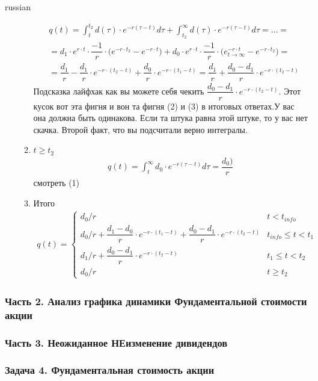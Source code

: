 \documentclass{article}
\begin{document}
\begin{otherlanguage*}{russian}
\begin{itemize}
\begin{enumerate}
\begin{align*}
&q(t) = \int_{t}^{t_2} d(\tau) \cdot e^{-r(\tau - t)} d \tau + \int_{t_2}^{\infty} d(\tau) \cdot e^{-r(\tau - t)} d \tau = \ldots = \\
&= d_1 \cdot e^{r \cdot t} \cdot \dfrac{-1}{r} \cdot  \Big( e^{-r \cdot t_2} - e^{-r \cdot t} \Big) + d_0 \cdot e ^{r \cdot t } \cdot \dfrac{-1}{r} \cdot \Big( e^{-r \cdot t}_{t \rightarrow \infty} - e^{-r \cdot t_2} \Big) = \\
&= \dfrac{d_1}{r} - \dfrac{d_1}{r} \cdot e ^{-r \cdot (t_2 -t)} + \dfrac{d_0}{r} \cdot e ^{-r \cdot (t_1 - t)} = \dfrac{d_1}{r} + \dfrac{d_0 - d_1}{r} \cdot e ^ {-r \cdot (t_2 - t)} 
\end{align*}
Подсказка лайфхак как вы можете себя чекить $ \dfrac{d_0 - d_1}{r} \cdot e^{-r \cdot (t_2 - t)} $. Этот кусок вот эта фигня и вон та фигня (2) и (3) в итоговых ответах.У вас она должна быть одинакова. Если та штука равна этой штуке, то у вас нет скачка. Второй факт, что вы подсчитали верно интегралы.
\item $ t \ge t_2 $ 
\begin{align*}
q(t) = \int_{t}^{\infty} d_0 \cdot e^{-r(\tau - t)} d \tau = \dfrac{d_0)}{r}
\end{align*} смотреть (1) 
\item Итого
\begin{align*}
q(t) = \begin{cases} 
d_0 / r  & t < t_{info}  \\
d_0 / r + \dfrac{d_1 - d_0}{r} \cdot e^{-r \cdot (t_1 - t) } + \dfrac{d_0 - d_1}{r} \cdot e ^{-r \cdot (t_2 - t) } & t_{info} \le t < t_1\\
d_1 / r + \dfrac{d_0 - d_1}{r} \cdot e ^ {-r \cdot (t_2 - t)} & t_1 \le t < t_2 \\
d_0 / r  & t \ge t_2
\end{cases}
\end{align*}
\end{enumerate}
\end{itemize}
\subsubsection*{Часть 2. Анализ графика динамики Фундаментальной стоимости акции}
\subsubsection*{Часть 3. Неожиданное НЕизменение дивидендов}
\subsubsection*{Задача 4. Фундаментальная стоимость акции}
\end{otherlanguage*} 
\end{document}
